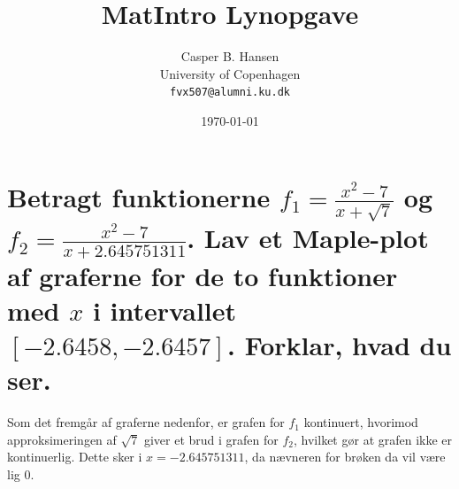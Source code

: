 \documentclass[11pt,a4paper]{article}
\title{MatIntro Lynopgave \assignmentnumber}
\author
{
    Casper B. Hansen\\
    University of Copenhagen\\
    {\tt fvx507@alumni.ku.dk}
}
\date{\today}
\begin{document}

\section
{
    \mdseries Betragt funktionerne $f_1 = \frac{x^2 - 7}{x + \sqrt{7}}$ og
    $f_2 = \frac{x^2 - 7}{x + 2.645751311}$.
    Lav et Maple-plot af graferne for de to funktioner med $x$ i intervallet
    $[-2.6458,-2.6457]$. Forklar, hvad du ser.
}
Som det fremgår af graferne nedenfor, er grafen for $f_1$ kontinuert,
hvorimod approksimeringen af $\sqrt{7}$ giver et brud i grafen for $f_2$,
hvilket gør at grafen ikke er kontinuerlig. Dette sker i $x = -2.645751311$,
da nævneren for brøken da vil være lig $0$.
\end{document}
